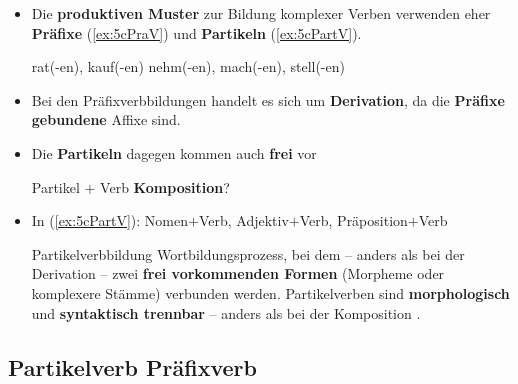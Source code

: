 \begin{frame}

\begin{itemize}
\item Die \textbf{produktiven Muster} zur Bildung komplexer Verben verwenden eher \textbf{Präfixe} (\ref{ex:5cPraV}) und \textbf{Partikeln} (\ref{ex:5cPartV}).

\ea 
\ea\label{ex:5cPraV} rat(-en), kauf(-en)
\ex\label{ex:5cPartV} nehm(-en), mach(-en), stell(-en)
\z 
\z 

\item Bei den Präfixverbbildungen handelt es sich um \textbf{Derivation}, da die \textbf{Präfixe} \textbf{gebundene} Affixe sind.


\item Die \textbf{Partikeln} dagegen kommen auch \textbf{frei} vor

\medskip

Partikel $+$ Verb \ras \textbf{Komposition}?

\item In (\ref{ex:5cPartV}): Nomen$+$Verb, Adjektiv$+$Verb, Präposition$+$Verb

\pause
\medskip 

\begin{block}{Partikelverbbildung}
Wortbildungsprozess, bei dem -- anders als bei der Derivation -- zwei \textbf{frei vorkommenden Formen} (Morpheme oder komplexere Stämme) verbunden werden. Partikelverben sind \textbf{morphologisch} und \textbf{syntaktisch trennbar} -- anders als bei der Komposition . 
\end{block}

\end{itemize}

\end{frame}


\subsection{Partikelverb \vs Präfixverb}

